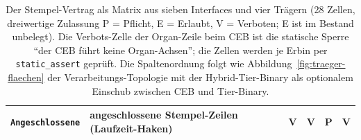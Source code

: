 \begin{nurlang}
\begin{table}[htbp]
\begin{tabular}{@{}llcccc@{}}
\texttt{Angeschlossene} & angeschlossene Stempel-Zeilen (Laufzeit-Haken)    & V & V & P & V \\
\bottomrule
\end{tabular}
\caption{Der Stempel-Vertrag als Matrix aus sieben Interfaces und vier Trägern (28 Zellen, dreiwertige
Zulassung P = Pflicht, E = Erlaubt, V = Verboten; E ist im Bestand unbelegt). Die Verbots-Zelle der
Organ-Zeile beim CEB ist die statische Sperre \enquote{der CEB führt keine Organ-Achsen}; die Zellen
werden je Erbin per \texttt{static\_assert} geprüft. Die Spaltenordnung folgt wie
Abbildung~\ref{fig:traeger-flaechen} der Verarbeitungs-Topologie mit der Hybrid-Tier-Binary als
optionalem Einschub zwischen CEB und Tier-Binary.}\label{tab:stempel-matrix}
\end{table}
\end{nurlang}
